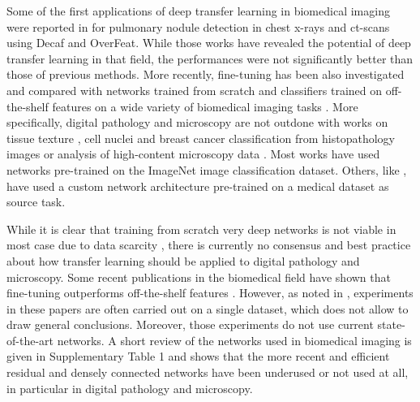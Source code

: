 Some of the first applications of deep transfer learning in biomedical imaging were reported in \parencite{bar2015chest,ciompi2015automatic,van2015off} for pulmonary nodule detection in chest x-rays and \acrshort{ct}-scans using Decaf and OverFeat. While those works have revealed the potential of deep transfer learning in that field, the performances were not significantly better than those of previous methods. More recently, fine-tuning has been also investigated and compared with networks trained from scratch and classifiers trained on off-the-shelf features on a wide variety of biomedical imaging tasks \parencite{antony2016quantifying,esteva2017dermatologist,gulshan2016development, ravishankar2016understanding,shin2016deep,tajbakhsh2016convolutional}. More specifically, digital pathology and microscopy are not outdone with works on tissue texture \parencite{kieffer2017convolutional}, cell nuclei \parencite{bayramoglu2016transfer} and breast cancer \parencite{han2017breast} classification from histopathology images or analysis of high-content microscopy data \parencite{kraus2017automated}. Most works have used networks pre-trained on the ImageNet image classification dataset. Others, like \parencite{kraus2017automated}, have used a custom network architecture pre-trained on a medical dataset as source task. 

While it is clear that training from scratch very deep networks is not viable in most case due to data scarcity \parencite{bayramoglu2016transfer,tajbakhsh2016convolutional}, there is currently no consensus and best practice about how transfer learning should be applied to digital pathology and microscopy. Some recent publications in the biomedical field have shown that fine-tuning outperforms off-the-shelf features \parencite{antony2016quantifying,kieffer2017convolutional,ravishankar2016understanding,shin2016deep}. However, as noted in \parencite{litjens2017survey}, experiments in these papers are often carried out on a single dataset, which does not allow to draw general conclusions. Moreover, those experiments do not use current state-of-the-art networks. A short review of the networks used in biomedical imaging is given in Supplementary Table 1 and shows that the more recent and efficient residual and densely connected networks have been underused or not used at all, in particular in digital pathology and microscopy.








